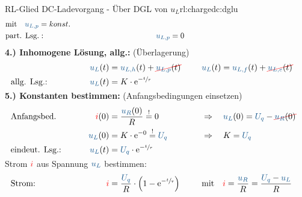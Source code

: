 {\begin{bsp}{RL-Glied DC-Ladevorgang - Über DGL von $u_L$}{rl:chargedc:dglu}
\begin{align*}
                &\text{mit}\quad \ecv{u_{L,p}} = konst.  \\
        &\text{part. Lsg.}:&&&
            \ecv{u_{L,p}} &= 0
            \\[-15pt]&\hphantom{R1ooooooo}&&&\hphantom{L3oooooooooooooooooooo}&\hphantom{R3ooo}&&&&\hphantom{R5oooooooooooooooooooooo}\nonumber%
        \end{align*}%
    \textbf{4.) Inhomogene Lösung, allg.:} (Überlagerung)%
    \begin{align*}%
        &&&&
            \ecv{u_L}(t) &= \ecv{u_{L,h}}(t) + \redcancel{\ecv{u_{L,p}}(t)} &&&
            &\ecv{u_L}(t)= \ecv{u_{L,f}}(t) + \redcancel{\ecv{u_{L,e}}(t)}  \\
        &\text{allg. Lsg.:}&&&
            \ecv{u_L}(t) &= K \cdot \mathrm{e}^{-\sfrac{t}{\tau}}
        \\[-15pt]&\hphantom{R1oooooooooooo}&&&\hphantom{L3ooo}&\hphantom{R3oooooooooooooooo}&&&&\hphantom{R5oooooooooooooooooooooo}\nonumber%
    \end{align*}%
    \textbf{5.) Konstanten bestimmen:} (Anfangsbedingungen einsetzen)%
    \begin{align*}%
        &\text{Anfangsbed.}&&&
            \eci{i}(0) &= \frac{\ecv{u_R}(0)}{R} \overset{!}{=} 0 &&&
            &\Rightarrow\quad \ecv{u_L}(0) = \ecv{U_q} - \redcancel{\ecv{u_R}(0)}\\
        &&&&
            \ecv{u_L}(0) &= K \cdot \mathrm{e}^{-0} \overset{!}{=} \ecv{U_q} &&&
            &\Rightarrow\quad K = \ecv{U_q}\\
        &\text{eindeut. Lsg.:}&&&
            \ecv{u_L}(t) &= \ecv{U_q} \cdot \mathrm{e}^{-\sfrac{t}{\tau}}
        \\[-15pt]&\hphantom{R1oooooooooooo}&&&\hphantom{L3ooo}&\hphantom{R3oooooooooooooooo}&&&&\hphantom{R5oooooooooooooooooooooo}\nonumber%
        \end{align*}%
    Strom ${\color{red}i}$ aus Spannung $\ecv{u_L}$ bestimmen:%
    \begin{align*}%
        &\text{Strom:}&&&
            \eci{i} &= \frac{\ecv{U_q}}{R} \cdot \left( 1 - \mathrm{e}^{-\sfrac{t}{\tau}} \right) &&&
            &\text{mit}\quad \eci{i} = \frac{\ecv{u_R}}{R} = \frac{\ecv{U_q} - \ecv{u_L}}{R}
        \\[-15pt]&\hphantom{R1oooooooooooo}&&&\hphantom{L3ooo}&\hphantom{R3oooooooooooooooo}&&&&\hphantom{R5oooooooooooooooooooooo}\nonumber%
    \end{align*}
    \endgroup
\end{bsp}
}%

